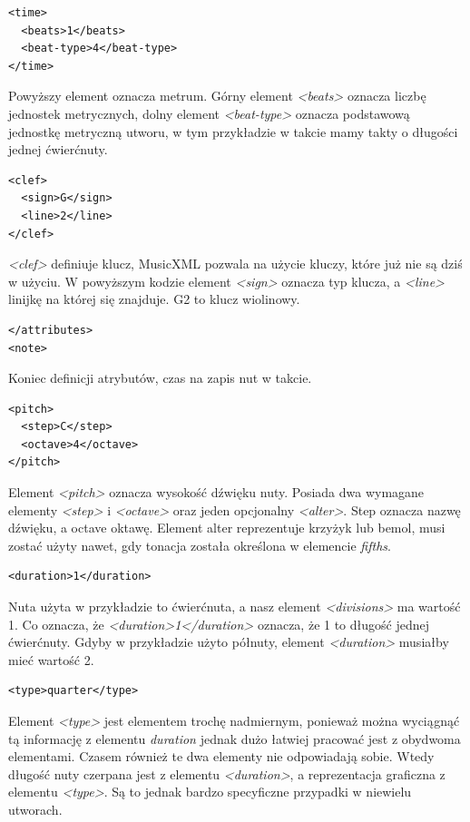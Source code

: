 \documentclass[printmode, eng, openany]{mgr}
\begin{document}
\begin{lstlisting}
<time>
  <beats>1</beats>
  <beat-type>4</beat-type>
</time>
\end{lstlisting}
Powyższy element oznacza metrum. Górny element \textit{<beats>} oznacza liczbę jednostek metrycznych, dolny element \textit{<beat-type>} oznacza podstawową jednostkę metryczną utworu, w tym przykładzie w takcie mamy takty o długości jednej ćwierćnuty.

\begin{lstlisting}
<clef>
  <sign>G</sign>
  <line>2</line>
</clef>
\end{lstlisting}
\textit{<clef>} definiuje klucz, MusicXML pozwala na użycie kluczy, które już nie są dziś w użyciu. W powyższym kodzie element \textit{<sign>} oznacza typ klucza, a \textit{<line>} linijkę na której się znajduje. G2 to klucz wiolinowy.

\begin{lstlisting}
</attributes>
<note>
\end{lstlisting}
Koniec definicji atrybutów, czas na zapis nut w takcie.

\begin{lstlisting}
<pitch>
  <step>C</step>
  <octave>4</octave>
</pitch>
\end{lstlisting}
Element \textit{<pitch>} oznacza wysokość dźwięku nuty. Posiada dwa wymagane elementy \textit{<step>} i \textit{<octave>} oraz jeden opcjonalny \textit{<alter>}. Step oznacza nazwę dźwięku, a octave oktawę. Element alter reprezentuje krzyżyk lub bemol, musi zostać użyty nawet, gdy  tonacja została określona w elemencie \textit{fifths}.

\begin{lstlisting}
<duration>1</duration>
\end{lstlisting}
Nuta użyta w przykładzie to ćwierćnuta, a nasz element \textit{<divisions>} ma wartość 1. Co oznacza, że \textit{<duration>1</duration>} oznacza, że 1 to długość jednej ćwierćnuty. Gdyby w przykładzie użyto półnuty, element \textit{<duration>} musiałby mieć wartość 2.

\begin{lstlisting}
<type>quarter</type>
\end{lstlisting}
Element \textit{<type>} jest elementem trochę nadmiernym, ponieważ można wyciągnąć tą informację z elementu \textit{duration} jednak dużo łatwiej pracować jest z obydwoma elementami. Czasem również te dwa elementy nie odpowiadają sobie. Wtedy długość nuty czerpana jest z elementu \textit{<duration>}, a reprezentacja graficzna z elementu \textit{<type>}. Są to jednak bardzo specyficzne przypadki w niewielu utworach.
\end{document}
